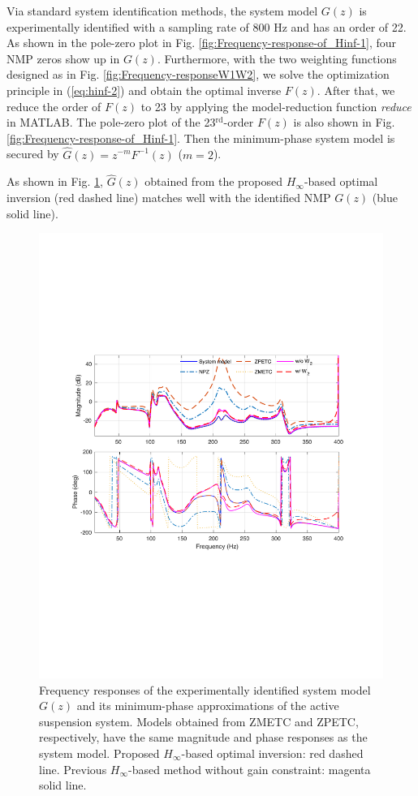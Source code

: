 \documentclass [11pt, proquest] {uwthesis}[2020/02/24]
\begin{document}
Via standard system identification methods, the system model $G(z)$
is experimentally identified with a sampling rate of 800 Hz and has
an order of 22. As shown in the pole-zero plot in Fig. \ref{fig:Frequency-response-of_Hinf-1},
four NMP zeros show up in $G(z)$. Furthermore, with the two weighting
functions designed as in Fig. \ref{fig:Frequency-responseW1W2}, we
solve the optimization principle in (\ref{eq:hinf-2}) and obtain
the optimal inverse $F(z)$. After that, we reduce the order of $F(z)$
to 23 by applying the model-reduction function \emph{reduce }in MATLAB.
The pole-zero plot of the 23$^{\text{rd}}$-order $F(z)$ is also
shown in Fig. \ref{fig:Frequency-response-of_Hinf-1}. Then the minimum-phase
system model is secured by $\hat{G}(z)=z^{-m}F^{-1}(z)$ ($m=2$).

As shown in Fig. \ref{fig:Frequency-response-of_Hinf}, $\hat{G}(z)$
obtained from the proposed $H_{\infty}$-based optimal inversion (red
dashed line) matches well with the identified NMP $G(z)$ (blue solid
line).
\begin{figure}[!ht]
\begin{centering}
\includegraphics[width=15cm]{Model-inversion/suspension_all}
\par\end{centering}
\caption{\label{fig:Frequency-response-of_Hinf}Frequency responses of the
experimentally identified system model $G(z)$ and its minimum-phase
approximations of the active suspension system. Models obtained from
ZMETC and ZPETC, respectively, have the same magnitude and phase responses
as the system model. Proposed $H_{\infty}$-based optimal inversion:
red dashed line. Previous $H_{\infty}$-based method without gain
constraint: magenta solid line.}
\end{figure}
\end{document}
